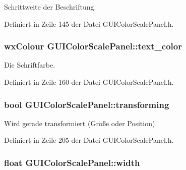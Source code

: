 Schrittweite der Beschriftung. 



Definiert in Zeile 145 der Datei G\-U\-I\-Color\-Scale\-Panel.\-h.

\hypertarget{classGUIColorScalePanel_a48e282e7a3bfff30894e9e6edfd120dc}{
\subsubsection[{text\-\_\-color}]{\setlength{\rightskip}{0pt plus 5cm}wx\-Colour G\-U\-I\-Color\-Scale\-Panel\-::text\-\_\-color\hspace{0.3cm}{\ttfamily [private]}}}\label{classGUIColorScalePanel_a48e282e7a3bfff30894e9e6edfd120dc}


Die Schriftfarbe. 



Definiert in Zeile 160 der Datei G\-U\-I\-Color\-Scale\-Panel.\-h.

\hypertarget{classGUIColorScalePanel_a3330450ed906fb99f56ed825d53f69e1}{
\subsubsection[{transforming}]{\setlength{\rightskip}{0pt plus 5cm}bool G\-U\-I\-Color\-Scale\-Panel\-::transforming\hspace{0.3cm}{\ttfamily [private]}}}\label{classGUIColorScalePanel_a3330450ed906fb99f56ed825d53f69e1}


Wird gerade transformiert (Größe oder Position). 



Definiert in Zeile 205 der Datei G\-U\-I\-Color\-Scale\-Panel.\-h.

\hypertarget{classGUIColorScalePanel_a1bc7bdf89d2447cddd08f5ae5f6638fa}{
\subsubsection[{width}]{\setlength{\rightskip}{0pt plus 5cm}float G\-U\-I\-Color\-Scale\-Panel\-::width\hspace{0.3cm}{\ttfamily [private]}}}\label{classGUIColorScalePanel_a1bc7bdf89d2447cddd08f5ae5f6638fa}


